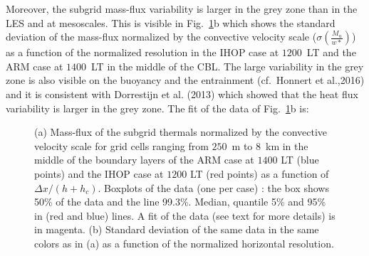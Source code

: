 Moreover, the subgrid mass-flux variability is larger in the grey zone than in the LES and at mesoscales. This is visible in Fig.~\ref{trigDavid}b which shows the standard deviation of the mass-flux normalized by the convective velocity scale ($\sigma(\frac{M_u}{w*})$) as a function of the normalized resolution in the IHOP case at $1200$~LT and the ARM case at $1400$~LT in the middle of the CBL. The large variability in the grey zone is also visible on the buoyancy and the entrainment (cf.~Honnert et al.,2016) and it is consistent with Dorrestijn et al. (2013) which showed that the heat flux variability is larger in the grey zone. The fit of the data of Fig.~\ref{trigDavid}b is:

\begin{figure}
\caption[]{(a) Mass-flux of the subgrid thermals normalized by the convective velocity scale for grid cells ranging from $250$~m to $8$~km in the middle of the boundary layers of the ARM case at $1400$ LT (blue points) and the IHOP case at $1200$ LT (red points) as a function of $\Delta x/({h}+{h}_{c})$. Boxplots of the data (one per case) : the box shows 50\% of the data and the line 99.3\%. Median, quantile 5\% and 95\% in (red and blue) lines. A fit of the data (see text for more details) is in magenta. (b) Standard deviation of the same data in the same colors as in (a) as a function of the normalized horizontal resolution.}
\label{trigDavid}
\end{figure}

